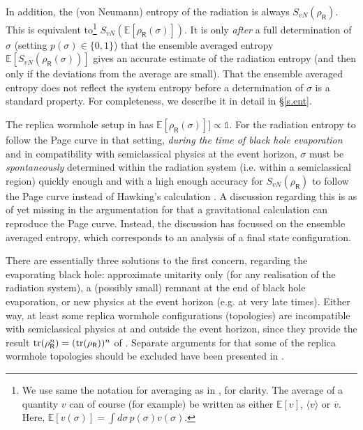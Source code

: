 \documentclass[11pt]{article}
\numberwithin{equation}{section}
\begin{document}
\begin{enumerate}
In addition, the (von Neumann) entropy of the radiation is always $S_{vN}(\rho_\textsf{R})$. This is equivalent to\footnote{We use same the notation for averaging as in \cite{Stanford:2020wkf}, for clarity. The average of a quantity $v$ can of course (for example) be written as either $\mathbb{E}[v]$, $\langle v\rangle$ or $\overline{v}$. Here, $\mathbb{E}[v(\sigma)]=\int d\sigma\, p(\sigma)v(\sigma)$.} $S_{vN}(\mathbb{E}[\rho_\textsf{R}(\sigma)])$. It is only \emph{after} a full determination of $\sigma$ (setting $p(\sigma)\in\{0,1\}$) that the ensemble averaged entropy $\mathbb{E}[S_{vN}(\rho_\textsf{R}(\sigma))]$ gives an accurate estimate of the radiation entropy (and then only if the deviations from the average are small). That the ensemble averaged entropy does not reflect the system entropy before a determination of $\sigma$ is a standard property. For completeness, we describe it in detail in \S\ref{s.ent}.

The replica wormhole setup in \cite{Penington:2019kki} has $\mathbb{E}[\rho_\textsf{R}(\sigma)]]\propto\mathbb{1}$. For the radiation entropy to follow the Page curve in that setting, {\it during the time of black hole evaporation} and in compatibility with semiclassical physics at the event horizon, $\sigma$ must be \emph{spontaneously} determined within the radiation system (i.e. within a semiclassical region) quickly enough and with a high enough accuracy for $S_{vN}(\rho_\textsf{R})$ to follow the Page curve instead of Hawking's calculation \cite{Hawking:1976ra}. A discussion regarding this is as of yet missing in the argumentation for that a gravitational calculation can reproduce the Page curve. Instead, the discussion has focussed on the ensemble averaged entropy, which corresponds to an analysis of a final state configuration.
\end{enumerate}

There are essentially three solutions to the first concern, regarding the evaporating black hole: approximate unitarity only (for any realisation of the radiation system), a (possibly small) remnant at the end of black hole evaporation, or new physics at the event horizon (e.g. at very late times). Either way, at least some replica wormhole configurations (topologies) are incompatible with semiclassical physics at and outside the event horizon, since they provide the result ${\rm tr}(\rho_\textsf{R}^n)=({\rm tr}(\rho_\textsf{R}))^n$ of \cite{Penington:2019kki,Almheiri:2019qdq}. Separate arguments for that some of the replica wormhole topologies should be excluded have been presented in \cite{Giddings:2020yes}. 
\end{document}
